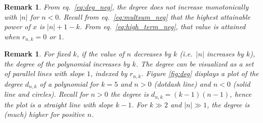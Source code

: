 \documentclass[review]{elsarticle}
\theoremstyle{plain}
\newtheorem{remark}[theorem]{Remark}
\begin{document}
\begin{remark}
From eq.~\ref{eq:deg_neg}, the degree does not increase monotonically with $|n|$ for $n<0$.
Recall from eq.~\eqref{eq:multsum_neg} that the highest attainable power of $x$ is $|n|+1-k$.
From eq.~\eqref{eq:high_term_neg}, that value is attained when $r_{n,k}=0$ or $1$.
\end{remark}
\begin{remark}
For fixed $k$, if the value of $n$ decreases by $k$ (i.e.~$|n|$ increases by $k$), the degree of the polynomial increases by $k$.
The degree can be visualized as a set of parallel lines with slope $1$, indexed by $r_{n,k}$.
Figure \ref{fig:deg} displays a plot of the degree $d_{n,k}$ of a polynomial for $k=5$ and $n>0$ (dotdash line) and $n<0$ (solid line and circles).
Recall for $n>0$ the degree is $d_{n,k}=(k-1)(n-1)$, hence the plot is a straight line with slope $k-1$.
For $k\gg2$ and $|n|\gg1$, the degree is (much) higher for positive $n$.
\end{remark}
\end{document}
